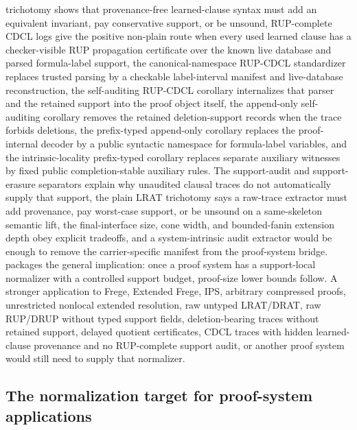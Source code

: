 \documentclass[11pt]{article}
\theoremstyle{definition}
\begin{document}
trichotomy shows that provenance-free learned-clause syntax must add an equivalent invariant, pay conservative support, or be unsound, RUP-complete CDCL logs give the positive non-plain route when every used learned clause has a checker-visible RUP propagation certificate over the known live database and parsed formula-label support, the canonical-namespace RUP-CDCL standardizer replaces trusted parsing by a checkable label-interval manifest and live-database reconstruction, the self-auditing RUP-CDCL corollary internalizes that parser and the retained support into the proof object itself, the append-only self-auditing corollary removes the retained deletion-support records when the trace forbids deletions, the prefix-typed append-only corollary replaces the proof-internal decoder by a public syntactic namespace for formula-label variables, and the intrinsic-locality prefix-typed corollary replaces separate auxiliary witnesses by fixed public completion-stable auxiliary rules.  The support-audit and support-erasure separators explain why unaudited clausal traces do not automatically supply that support, the plain LRAT trichotomy says a raw-trace extractor must add provenance, pay worst-case support, or be unsound on a same-skeleton semantic lift, the final-interface size, cone width, and bounded-fanin extension depth obey explicit tradeoffs, and a system-intrinsic audit extractor would be enough to remove the carrier-specific manifest from the proof-system bridge.   packages the general implication: once a proof system has a support-local normalizer with a controlled support budget, proof-size lower bounds follow.  A stronger application to Frege, Extended Frege, IPS, arbitrary compressed proofs, unrestricted nonlocal extended resolution, raw untyped LRAT/DRAT, raw RUP/DRUP without typed support fields, deletion-bearing traces without retained support, delayed quotient certificates, CDCL traces with hidden learned-clause provenance and no RUP-complete support audit, or another proof system would still need to supply that normalizer.

\subsection{The normalization target for proof-system applications}\label{subsec:normalization-target}
\end{document}
